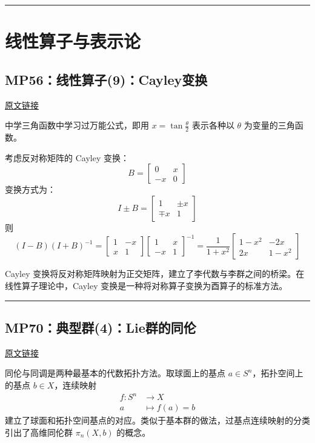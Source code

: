 \documentclass[10pt, openany]{book}
\begin{document}
\medskip
\noindent\rule{\textwidth}{0.4pt}

\chapter{线性算子与表示论}

\section{MP56：线性算子(9)：Cayley变换}
\label{sec:mp56}

\href{https://zhuanlan.zhihu.com/p/44948413}{原文链接}

中学三角函数中学习过万能公式，即用 $x = \tan \frac{\theta}{2}$ 表示各种以 $\theta$ 为变量的三角函数。

考虑反对称矩阵的 Cayley 变换：
\[
B = \begin{bmatrix} 0 & x \\ -x & 0 \end{bmatrix}
\]
变换方式为：
\[
I \pm B = \begin{bmatrix} 1 & \pm x \\ \mp x & 1 \end{bmatrix}
\]
则
\[
(I-B)(I+B)^{-1} = \begin{bmatrix} 1 & -x \\ x & 1 \end{bmatrix} \begin{bmatrix} 1 & x \\ -x & 1 \end{bmatrix}^{-1} = \frac{1}{1+x^2} \begin{bmatrix} 1-x^2 & -2x \\ 2x & 1-x^2 \end{bmatrix}
\]

Cayley 变换将反对称矩阵映射为正交矩阵，建立了李代数与李群之间的桥梁。在线性算子理论中，Cayley 变换是一种将对称算子变换为酉算子的标准方法。

\medskip
\noindent\rule{\textwidth}{0.4pt}

\section{MP70：典型群(4)：Lie群的同伦}
\label{sec:mp70}

\href{https://zhuanlan.zhihu.com/p/51659498}{原文链接}

同伦与同调是两种最基本的代数拓扑方法。取球面上的基点 $a \in S^n$，拓扑空间上的基点 $b \in X$，连续映射
\[
\begin{aligned}
f: S^n &\to X \\
a &\mapsto f(a) = b
\end{aligned}
\]
建立了球面和拓扑空间基点的对应。类似于基本群的做法，过基点连续映射的分类引出了高维同伦群 $\pi_n(X, b)$ 的概念。
\end{document}

